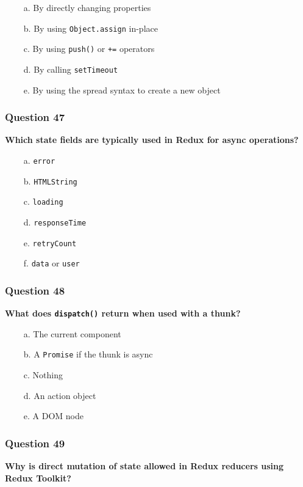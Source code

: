 \documentclass{article}
\newcommand{\cmark}{\textcolor{green}{\ding{51}}} %
\newcommand{\xmark}{\textcolor{red}{\ding{55}}}   %
\begin{document}
\begin{itemize}
  \item[\xmark\ a.] By directly changing properties
  \item[\xmark\ b.] By using \texttt{Object.assign} in-place
  \item[\xmark\ c.] By using \texttt{push()} or \texttt{+=} operators
  \item[\xmark\ d.] By calling \texttt{setTimeout}
  \item[\cmark\ e.] By using the spread syntax to create a new object
\end{itemize}

\subsubsection*{Question 47}
\textbf{Which state fields are typically used in Redux for async operations?}

\begin{itemize}
  \item[\cmark\ a.] \texttt{error}
  \item[\xmark\ b.] \texttt{HTMLString}
  \item[\cmark\ c.] \texttt{loading}
  \item[\xmark\ d.] \texttt{responseTime}
  \item[\xmark\ e.] \texttt{retryCount}
  \item[\cmark\ f.] \texttt{data} or \texttt{user}
\end{itemize}

\subsubsection*{Question 48}
\textbf{What does \texttt{dispatch()} return when used with a thunk?}

\begin{itemize}
  \item[\xmark\ a.] The current component
  \item[\cmark\ b.] A \texttt{Promise} if the thunk is async
  \item[\xmark\ c.] Nothing
  \item[\xmark\ d.] An action object
  \item[\xmark\ e.] A DOM node
\end{itemize}

\subsubsection*{Question 49}
\textbf{Why is direct mutation of state allowed in Redux reducers using Redux Toolkit?}
\end{document}
